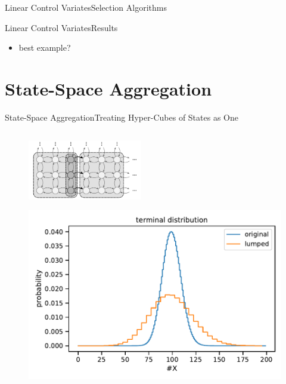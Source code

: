 \documentclass{beamer}
\begin{document}
\begin{frame}{Linear Control Variates}{Selection Algorithms}
\end{frame}

\begin{frame}{Linear Control Variates}{Results}
  \begin{itemize}
    \item best example?
  \end{itemize}
\end{frame}

\section{State-Space Aggregation}
\begin{frame}{State-Space Aggregation}{Treating Hyper-Cubes of States as One}
    \begin{columns}
        \begin{column}{.4\textwidth}
            \begin{figure}
            \includegraphics[width=5cm]{../gfx/macro_states.pdf}
            \end{figure}
            \begin{figure}
                \includegraphics[scale=.3]{../gfx/lumped_dist.pdf}
            \end{figure}
        \end{column}

\end{columns}
\end{frame}
\end{document}
